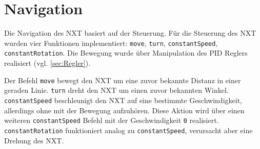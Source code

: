 \documentclass[oneside,abstractoff,a4paper]{scrartcl}
\begin{document}
\section{Navigation}
\label{sec:navigation}
Die Navigation des NXT basiert auf der Steuerung. Für die Steuerung des NXT wurden vier Funktionen implementiert: \texttt{move}, \texttt{turn}, \texttt{constantSpeed}, \texttt{constantRotation}. Die Bewegung wurde über Manipulation des PID Reglers realisiert (vgl. \cref{sec:Regler}).

Der Befehl \texttt{move} bewegt den NXT um eine zuvor bekannte Distanz in einer geraden Linie. \texttt{turn} dreht den NXT um einen zuvor bekannten Winkel. \texttt{constantSpeed} beschleunigt den NXT auf eine bestimmte Geschwindigkeit, allerdings ohne mit der Bewegung aufzuhören. Diese Aktion wird über einen weiteren \texttt{constantSpeed} Befehl mit der Geschwindigkeit \texttt{0} realisiert. \texttt{constantRotation} funktioniert analog zu \texttt{constantSpeed}, verursacht aber eine Drehung des NXT.


\end{document}
